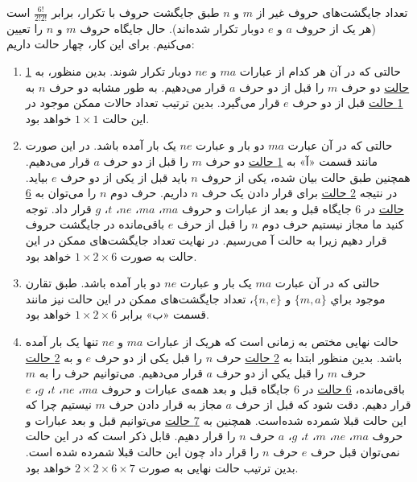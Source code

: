   \p
    تعداد جایگشت‌های حروف غیر از $m$ و $n$ طبق جایگشت حروف با تکرار، برابر $\frac{6!}{2!2!}$ است
    (هر یک از حروف $a$ و $e$ دوبار تکرار شده‌اند).
    حال جایگاه حروف $m$ و $n$ را تعیین می‌کنیم.
    برای این کار، چهار حالت داریم:
    \begin{enumerate}
      \item 
      حالتی که در آن هر کدام از عبارات $ma$ و $ne$
      دوبار تکرار شوند. بدین منظور، به
      \underline{1 حالت} 
       دو حرف 
      $m$ 
      را قبل از دو حرف 
      $a$
      قرار می‌دهیم.
      به طور مشابه دو حرف
       $n$ 
     به
     \underline{1 حالت}
       قبل از دو حرف 
       $e$
       قرار می‌گیرد.
      بدین ترتیب تعداد حالات ممکن موجود در این حالت 
      $1\times1$
      خواهد بود.
      
      \item
      حالتی که در آن عبارت $ma$ دو بار و عبارت $ne$ 
      یک بار آمده باشد. در این صورت مانند قسمت «آ» به
      \underline{1 حالت}  
       دو حرف 
      $m$
      را قبل از دو حرف 
      $a$
      قرار می‌دهیم.
      همچنین طبق حالت بیان شده، یکی از حروف 
      $n$ باید قبل از یکی از دو حرف $e$
      بیاید. در نتیجه
      \underline{2 حالت}
      برای قرار دادن یک حرف $n$ داریم. 
       حرف دوم 
      $n$
      را می‌توان به 
      \underline{6 حالت}
       در 6 جایگاه قبل و بعد از عبارات و حروف
      $ma$، 
      $ma$، 
      $ne$، 
      $t$،  
      $g$
      قرار داد.
      توجه کنید ما مجاز نیستیم حرف دوم
      $n$
      را قبل از حرف $e$
      باقی‌مانده در جایگشت حروف قرار دهیم زیرا به حالت آ می‌رسیم.
     در نهایت تعداد جایگشت‌های ممکن در این حالت به صورت 
      $1\times 2\times 6$
      خواهد بود.

      \item
      حالتی که در آن عبارت $ma$ یک بار و عبارت $ne$
    دو بار آمده باشد.
      طبق تقارن موجود براي 
      $\{m,a\}$ و
      $\{n,e\}$، 
    تعداد جایگشت‌های ممکن در این حالت نیز مانند قسمت «ب» برابر 
    $1\times 2\times 6$ 
      خواهد بود.
      
      \item
      حالت نهایی مختص به زمانی است که هریک از عبارات $ma$ و $ne$ تنها یک بار آمده باشد.
      بدین منظور ابتدا به
      \underline{2 حالت}
      حرف 
      $n$
      را قبل یکی از دو حرف 
      $e$
      و به
      \underline{2 حالت}  
      حرف  
      $m$
      را قبل يكي از دو حرف 
      $a$ 
      قرار می‌دهیم.
      می‌توانیم حرف
       را به $m$ باقی‌مانده،
      \underline{6 حالت} 
       در 6 جایگاه
      قبل و بعد همه‌ی عبارات و حروف 
      $ma$، $ne$، $t$، $g$، $e$
       قرار دهیم.
      دقت شود که قبل از حرف $a$ مجاز به قرار دادن حرف $m$ نیستیم چرا که این حالت قبلا شمرده شده‌است.
      همچنین به 
      \underline{7 حالت}
      می‌توانیم قبل و بعد عبارات و حروف
      $ma$،
      $ne$،
      $m$،
      $t$، $g$، $a$
      حرف $n$ را قرار دهیم.
      قابل ذکر است که در این حالت نمی‌توان قبل حرف $e$
      حرف $n$ را قرار داد چون این حالت قبلا شمرده شده است.
      بدین ترتیب حالت نهایی به صورت 
      $2\times 2 \times 6 \times 7$
      خواهد بود.
    \end{enumerate}
